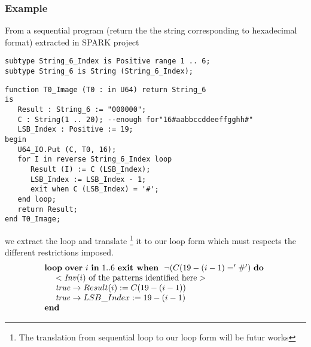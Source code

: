 \documentclass[a4paper,10pt]{article}
\newcommand{\idx}{\ensuremath{i}\xspace}
\newcommand{\KWloop}{\ensuremath{\mathrm{\textbf{loop}}~}}
\newcommand{\KWdo}{\ensuremath{\mathrm{\textbf{do}}~}}
\newcommand{\KWend}{\ensuremath{\mathrm{\textbf{end}}}}
\newcommand{\KWover}{\ensuremath{\mathrm{\textbf{over}}~}}
\newcommand{\KWin}{\ensuremath{~\mathrm{\textbf{in}}~}}
\newcommand{\KWexit}{\ensuremath{\mathrm{\textbf{exit when}}~}}
\newcommand{\Inv}[1]{\ensuremath{\mathit{Inv}(#1)\xspace}}
\begin{document}
\subsubsection*{Example}
From a sequential program (return the the string corresponding to hexadecimal format) 
extracted in SPARK project ~\cite{sparkskein:url} 
\begin{lstlisting}
subtype String_6_Index is Positive range 1 .. 6;
subtype String_6 is String (String_6_Index);
\end{lstlisting}

\begin{lstlisting}
function T0_Image (T0 : in U64) return String_6
is
   Result : String_6 := "000000";
   C : String(1 .. 20); --enough for"16#aabbccddeeffgghh#"
   LSB_Index : Positive := 19;
begin
   U64_IO.Put (C, T0, 16);
   for I in reverse String_6_Index loop
      Result (I) := C (LSB_Index);
      LSB_Index := LSB_Index - 1;
      exit when C (LSB_Index) = '#';
   end loop;
   return Result;
end T0_Image;
\end{lstlisting}

we extract the loop and translate \footnote{The translation from sequential loop to our 
loop form will be futur works} it to our loop form which must respects the different 
restrictions imposed.
$$\begin{array}{l}
  \KWloop \KWover \idx \KWin 1 .. 6 ~ \KWexit ~ \neg (C (19-(\idx-1) = '\#') ~ \KWdo \\
  ~~~~ < \textrm{\Inv{\idx} of the patterns identified here} >\\
  ~~~~ \mathit{true} \rightarrow Result (\idx) := C (19-(\idx-1))\\
  ~~~~ \mathit{true} \rightarrow LSB\_Index := 19 - (\idx-1)\\
  \KWend
\end{array}$$
\fi



\end{document}
